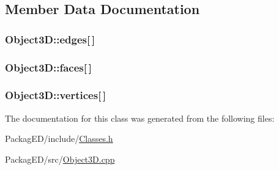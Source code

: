 \subsection{Member Data Documentation}
\subsubsection[{\texorpdfstring{edges}{edges}}]{ Object3\+D\+::edges\mbox{[}$\,$\mbox{]}}\hypertarget{class_object3_d_ad93f210748663a4d0aaa89287dee3dae}{}\label{class_object3_d_ad93f210748663a4d0aaa89287dee3dae}
\subsubsection[{\texorpdfstring{faces}{faces}}]{ Object3\+D\+::faces\mbox{[}$\,$\mbox{]}}\hypertarget{class_object3_d_a4cc7f57059a990a8573a7644a4d3ab2a}{}\label{class_object3_d_a4cc7f57059a990a8573a7644a4d3ab2a}
\subsubsection[{\texorpdfstring{vertices}{vertices}}]{ Object3\+D\+::vertices\mbox{[}$\,$\mbox{]}}\hypertarget{class_object3_d_a23cc82ea4ef0af8e0e22871bdbdba6c6}{}\label{class_object3_d_a23cc82ea4ef0af8e0e22871bdbdba6c6}


The documentation for this class was generated from the following files\+:\begin{DoxyCompactItemize}
\item 
Packag\+E\+D/include/\hyperlink{_classes_8h}{Classes.\+h}\item 
Packag\+E\+D/src/\hyperlink{_object3_d_8cpp}{Object3\+D.\+cpp}\end{DoxyCompactItemize}

